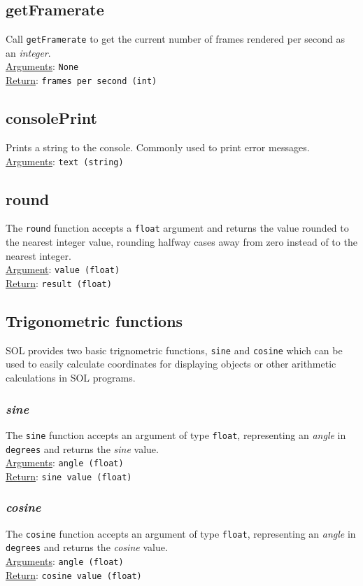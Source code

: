     \subsection{getFramerate}
    Call \texttt{getFramerate} to get the current number of frames rendered per second as an \textit{integer}.\\
    \underline{Arguments}: \texttt{None}\\
    \underline{Return}: \texttt{frames per second (int)}

    \subsection{consolePrint}
    Prints a string to the console. Commonly used to print error messages.\\
    \underline{Arguments}: \texttt{text (string)}

    \subsection{round}
    The \texttt{round} function accepts a \texttt{float} argument and returns the value rounded to the nearest integer value, rounding halfway cases away from zero instead of to the nearest integer.\\
    \underline{Argument}: \texttt{value (float)}\\
    \underline{Return}: \texttt{result (float)}

    \subsection{Trigonometric functions}
    SOL provides two basic trignometric functions, \texttt{sine} and \texttt{cosine} which can be used to easily calculate coordinates for displaying objects or other arithmetic calculations in SOL programs.

        \subsubsection{\textit{sine}}
        The \texttt{sine} function accepts an argument of type \texttt{float}, representing an \textit{angle} in \texttt{degrees} and returns
        the \textit{sine} value.\\
        \underline{Arguments}: \texttt{angle (float)}\\
        \underline{Return}: \texttt{sine value (float)}


        \subsubsection{\textit{cosine}}
        The \texttt{cosine} function accepts an argument of type \texttt{float}, representing an \textit{angle} in \texttt{degrees} and returns
        the \textit{cosine} value.\\
        \underline{Arguments}: \texttt{angle (float)}\\
        \underline{Return}: \texttt{cosine value (float)}


